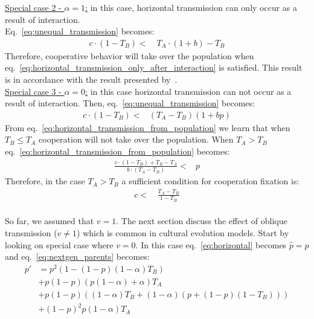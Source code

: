 \documentclass[12pt]{extarticle}
\begin{document}
\underline{Special case 2 - $\alpha =1$:} in this case, horizontal transmission can only occur as a result of interaction.
\\Eq.~\ref{eq:unequal_transmission} becomes:
\begin{equation} 
\begin{split} \label{eq:horizontal_transmission_only_after_interaction}
c\cdot(1-T_B)  < \,& T_A\cdot(1+b) - T_B
\end{split}
\end{equation}
Therefore, cooperative behavior will take over the population when eq.~\ref{eq:horizontal_transmission_only_after_interaction} is satisfied. 
This result is in accordance with the result presented by~\citet{lewin2017microbes}. 
\\\underline{Special case 3 - $\alpha = 0$:} in this case horizontal transmission can not occur as a result of interaction.  
Then, eq.~\ref{eq:unequal_transmission} becomes:
\begin{equation} 
\begin{split} \label{eq:horizontal_transmission_from_population}
c\cdot(1-T_B) < & (T_A-T_B)(1+bp)  
\end{split}
\end{equation}
From eq.~\ref{eq:horizontal_transmission_from_population} we learn that when $T_B\leq T_A$ cooperation will not take over the population.
When $T_A > T_B$ eq.~\ref{eq:horizontal_transmission_from_population} becomes:
\begin{equation} 
\begin{split} \label{eq:horizontal_transmission_from_population_reorder}
\frac{c\cdot(1-T_B)+T_B-T_A}{b\cdot(T_A-T_B)} < & p  
\end{split}
\end{equation}
Therefore, in the case $T_A>T_B$ a sufficient condition for cooperation fixation is:
\begin{equation} 
  \begin{split} \label{eq:sufficient_horizontal_transmission_from_population}
c < &\, \frac{T_A-T_B}{1-T_B}  
  \end{split}
  \end{equation}
\\So far, we assumed that $v=1$. The next section discuss the effect of oblique transmission ($v\neq 1$) which is common in cultural evolution models. 
Start by looking on special case where $v=0$. In this case eq.~\ref{eq:horizontal} becomes $\hat{p}=p$ and eq.~\ref{eq:nextgen_parents} becomes:
\begin{equation} 
\begin{split}\label{eq:nextgen_parents_oblique_only}
p' 
& = p^2 (1 - (1-p) (1-\alpha) T_B) \\
& + p(1-p)(p (1-\alpha) + \alpha) T_A \\
& + p(1-p)((1-\alpha)T_B + (1-\alpha)(p+(1-p)(1-T_B))) \\
& + (1-p)^2 p (1-\alpha) T_A
\end{split}
\end{equation}
\end{document}
